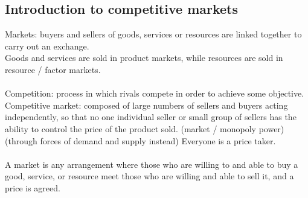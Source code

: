 \documentclass[a4paper,12pt]{article}
\begin{document}
\subsection{Introduction to competitive markets}
Markets: buyers and sellers of goods, services or resources are linked together to carry out an exchange.\\
Goods and services are sold in product markets, while resources are sold in resource / factor markets.\\\\
Competition: process in which rivals compete in order to achieve some objective.\\
Competitive market: composed of large numbers of sellers and buyers acting independently, so that no one individual seller or small group of sellers has the ability to control the price of the product sold. (market / monopoly power) (through forces of demand and supply instead) Everyone is a price taker.\\\\
A market is any arrangement where those who are willing to and able to buy a good, service, or resource meet those who are willing and able to sell it, and a price is agreed.
\end{document}
